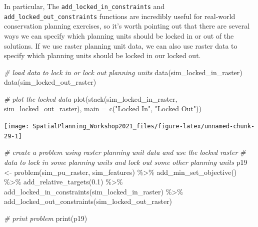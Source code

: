 \documentclass[
  12pt,
]{book}
\newenvironment{Shaded}{\begin{snugshade}}{\end{snugshade}}
\newcommand{\AttributeTok}[1]{\textcolor[rgb]{0.77,0.63,0.00}{#1}}
\newcommand{\CommentTok}[1]{\textcolor[rgb]{0.56,0.35,0.01}{\textit{#1}}}
\newcommand{\FloatTok}[1]{\textcolor[rgb]{0.00,0.00,0.81}{#1}}
\newcommand{\FunctionTok}[1]{\textcolor[rgb]{0.00,0.00,0.00}{#1}}
\newcommand{\NormalTok}[1]{#1}
\newcommand{\OtherTok}[1]{\textcolor[rgb]{0.56,0.35,0.01}{#1}}
\newcommand{\SpecialCharTok}[1]{\textcolor[rgb]{0.00,0.00,0.00}{#1}}
\newcommand{\StringTok}[1]{\textcolor[rgb]{0.31,0.60,0.02}{#1}}
\begin{document}
In particular, The \texttt{add\_locked\_in\_constraints} and \texttt{add\_locked\_out\_constraints} functions are incredibly useful for real-world conservation planning exercises, so it's worth pointing out that there are several ways we can specify which planning units should be locked in or out of the solutions. If we use raster planning unit data, we can also use raster data to specify which planning units should be locked in our locked out.

\begin{Shaded}
\begin{Highlighting}[]
\CommentTok{\# load data to lock in or lock out planning units}
\FunctionTok{data}\NormalTok{(sim\_locked\_in\_raster)}
\FunctionTok{data}\NormalTok{(sim\_locked\_out\_raster)}

\CommentTok{\# plot the locked data}
\FunctionTok{plot}\NormalTok{(}\FunctionTok{stack}\NormalTok{(sim\_locked\_in\_raster, sim\_locked\_out\_raster),}
     \AttributeTok{main =} \FunctionTok{c}\NormalTok{(}\StringTok{"Locked In"}\NormalTok{, }\StringTok{"Locked Out"}\NormalTok{))}
\end{Highlighting}
\end{Shaded}

\begin{center}\texttt{[image: SpatialPlanning\_Workshop2021\_files/figure-latex/unnamed-chunk-29-1]} \end{center}

\begin{Shaded}
\begin{Highlighting}[]
\CommentTok{\# create a problem using raster planning unit data and use the locked raster}
\CommentTok{\# data to lock in some planning units and lock out some other planning units}
\NormalTok{p19 }\OtherTok{\textless{}{-}} \FunctionTok{problem}\NormalTok{(sim\_pu\_raster, sim\_features) }\SpecialCharTok{\%\textgreater{}\%}
       \FunctionTok{add\_min\_set\_objective}\NormalTok{() }\SpecialCharTok{\%\textgreater{}\%}
       \FunctionTok{add\_relative\_targets}\NormalTok{(}\FloatTok{0.1}\NormalTok{) }\SpecialCharTok{\%\textgreater{}\%}
       \FunctionTok{add\_locked\_in\_constraints}\NormalTok{(sim\_locked\_in\_raster) }\SpecialCharTok{\%\textgreater{}\%}
       \FunctionTok{add\_locked\_out\_constraints}\NormalTok{(sim\_locked\_out\_raster)}

\CommentTok{\# print problem}
\FunctionTok{print}\NormalTok{(p19)}
\end{Highlighting}
\end{Shaded}
\end{document}
